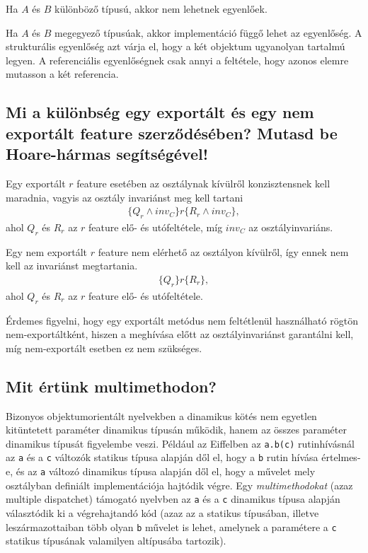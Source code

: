 	Ha $A$ és $B$ különböző típusú, akkor nem lehetnek egyenlőek.
	
	Ha $A$ és $B$ megegyező típusúak, akkor implementáció függő lehet az egyenlőség. A strukturális egyenlőség azt várja el, hogy a két objektum ugyanolyan tartalmú legyen. A referenciális egyenlőségnek csak annyi a feltétele, hogy azonos elemre mutasson a két referencia.
	
\subsection{ Mi a különbség egy exportált és egy nem exportált feature szerződésében? Mutasd be Hoare-hármas segítségével! }
	Egy exportált $r$ feature esetében az osztálynak kívülről konzisztensnek kell maradnia, vagyis az osztály invariánst meg kell tartani
	\begin{align*}
		\{ Q_r \wedge inv_C \}r\{ R_r \wedge inv_C \},
	\end{align*}
	ahol $Q_r$ és $R_r$ az $r$ feature elő- és utófeltétele, míg $inv_C$ az osztályinvariáns.
	
	Egy nem exportált $r$ feature nem elérhető az osztályon kívülről, így ennek nem kell az invariánst megtartania.
	\begin{align*}
	\{Q_r\}r\{R_r\},
	\end{align*}
	ahol $Q_r$ és $R_r$ az $r$ feature elő- és utófeltétele.
	
	Érdemes figyelni, hogy egy exportált metódus nem feltétlenül használható rögtön nem-exportáltként, hiszen a meghívása előtt az osztályinvariánst garantálni kell, míg nem-exportált esetben ez nem szükséges.
	
\subsection{ Mit értünk multimethodon? }
	Bizonyos objektumorientált nyelvekben a dinamikus kötés nem egyetlen kitüntetett paraméter dinamikus típusán működik, hanem az összes paraméter dinamikus típusát figyelembe veszi. Például az Eiffelben az \lstinline[language=Eiffel]|a.b(c)| rutinhívásnál az \lstinline[language=Eiffel]|a| és a \lstinline[language=Eiffel]|c| változók statikus típusa alapján dől el, hogy a \lstinline[language=Eiffel]|b| rutin hívása értelmes-e, és az \lstinline[language=Eiffel]|a| változó dinamikus típusa alapján dől el, hogy a művelet mely osztályban definiált implementációja hajtódik végre. Egy \textit{multimethodokat} (azaz multiple dispatchet) támogató nyelvben az \lstinline[language=Eiffel]|a| és a \lstinline[language=Eiffel]|c| dinamikus típusa alapján választódik ki a végrehajtandó kód (azaz az a statikus típusában, illetve leszármazottaiban több olyan \lstinline[language=Eiffel]|b| művelet is lehet, amelynek a paramétere a \lstinline[language=Eiffel]|c| statikus típusának valamilyen altípusába tartozik).
	
